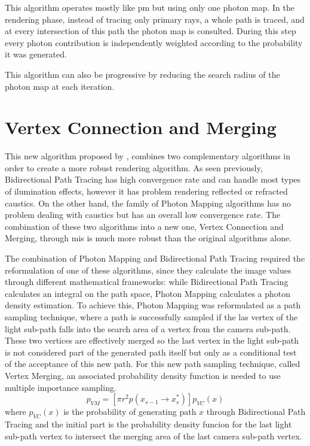 This algorithm operates mostly like \gls{pm} but using only one photon map. In the rendering phase, instead of tracing only primary rays, a whole path is traced, and at every intersection of this path the photon map is consulted. During this step every photon contribution is independently weighted according to the probability it was generated.

This algorithm can also be progressive by reducing the search radius of the photon map at each iteration.

\section{Vertex Connection and Merging}

This new algorithm proposed by \cite{Georgiev}, combines two complementary algorithms in order to create a more robust rendering algorithm. As seen previously, Bidirectional Path Tracing has high convergence rate and can handle most types of ilumination effects, however it has problem rendering reflected or refracted caustics. On the other hand, the family of Photon Mapping algorithms has no problem dealing with caustics but has an overall low convergence rate. The combination of these two algorithms into a new one, Vertex Connection and Merging, through \gls{mis} is much more robust than the original algorithms alone.

The combination of Photon Mapping and Bidirectional Path Tracing required the reformulation of one of these algorithms, since they calculate the image values through different mathematical frameworks: while Bidirectional Path Tracing calculates an integral on the path space, Photon Mapping calculates a photon density estimation. To achieve this, Photon Mapping was reformulated as a path sampling technique, where a path is successfully sampled if the las vertex of the light sub-path falls into the search area of a vertex from the camera sub-path. These two vertices are effectively merged so the last vertex in the light sub-path is not considered part of the generated path itself but only as a conditional test of the acceptance of this new path. For this new path sampling technique, called Vertex Merging, an associated probability density function is needed to use multiple importance sampling. 
\begin{equation}
p_{VM}=[\pi r^2 p(x_{s-1}\xrightarrow{}x_{s}^{*})]p_{VC}(x)
\label{eq:pvm}
\end{equation}
where $p_{VC}(x)$ is the probability of generating path $x$ through Bidirectional Path Tracing and the initial part is the probability density funcion for the last light sub-path vertex to intersect the merging area of the last camera sub-path vertex.

